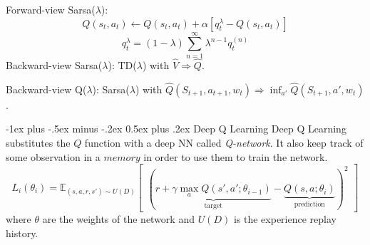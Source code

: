 \documentclass[10pt]{article}
\makeatletter
\renewcommand{\section}{\@startsection{section}{1}{0mm}%
                                {-1ex plus -.5ex minus -.2ex}%
                                {0.5ex plus .2ex}%
                                {\normalfont\large\bfseries}}
\makeatother
\begin{document}
\begin{multicols*}{2}
Forward-view Sarsa($\lambda$):
\begin{equation*}
    Q(s_t, a_t) \leftarrow Q(s_t, a_t) + \alpha \left[q_t^\lambda - Q(s_t, a_t) \right]
\end{equation*}
\begin{equation*}
    q_t^\lambda = (1-\lambda) \sum_{n=1}^\infty \lambda^{n-1} q_t^{(n)}
\end{equation*}
Backward-view Sarsa($\lambda$): TD($\lambda$) with $\hat V\Rightarrow\hat Q$.

Backward-view Q($\lambda$): Sarsa($\lambda$) with $\hat Q(S_{t+1},a_{t+1},w_t)\Rightarrow \inf_{a'}\hat Q(S_{t+1},a',w_t)$.


\section{Deep Q Learning}
Deep Q Learning substitutes the $Q$ function with a deep NN called \emph{Q-network}. 
It also keep track of some observation in a $memory$ in order to use them to train the network.
\begin{equation*}
L_i(\theta_i) = \mathbb{E}_{(s, a, r, s') \sim U(D)}\begin{bmatrix}
        ( \underbrace{r + \gamma \max\limits_a Q(s',a'; \theta_{i-1})}_\text{target} - \underbrace{Q(s,a;\theta_i)}_\text{prediction})^2
\end{bmatrix}
\end{equation*}
where $\theta$ are the weights of the network and $U(D)$ is the experience replay history.


\end{multicols*}
\end{document}
